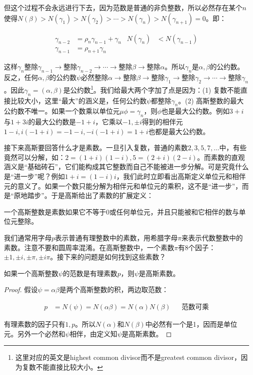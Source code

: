 \documentclass[b5paper]{ctexart}
\begin{document}
但这个过程不会永远进行下去，因为范数是普通的非负整数，所以必然存在某个$n$使得$N(\beta) > N(\gamma_1) > N(\gamma_2) > \dotsb > N(\gamma_n) > N(\gamma_{n+1})= 0$。即：

\begin{align*}
\gamma_{n-2} &= \rho_n \gamma_{n-1} + \gamma_n & N(\gamma_n) &< N(\gamma_{n-1}) \\
\gamma_{n-1} &= \rho_{n+1} \gamma_n
\end{align*}

这样$\gamma_n$整除$\gamma_{n-1} \to$整除$\gamma_{n-2} \to \dotsb \to$整除$\beta \to$整除$\alpha$。所以$\gamma_n$是$\alpha, \beta$的公约数。反之，任何$\alpha, \beta$的公约数$\psi$必然整除$\alpha \to$整除$\beta \to$整除$\gamma_1 \to$整除$\gamma_2 \to \dotsb \to$整除$\gamma_n$。因此$\gamma_n = (\alpha, \beta)$是公约数\footnote{这里对应的英文是highest common divisor而不是greatest common divisor，因为复数不能直接比较大小。}。我们给最大两个字加了点是因为：(1) 复数不能直接比较大小，这里“最大”的涵义是，任何公约数$\psi$都整除$\gamma_n$。(2) 高斯整数的最大公约数不唯一。如果一个数乘以单位元$\mu\phi = \gamma_n$，则$\phi$也是最大公约数。例如$3 + i$与$1 + 3i$的最大公约数是$-1 + i$，它乘以$-1, \pm i$得到的相伴元$1 - i, i(-1 + i) = -1 - i, -i(-1 + i) = 1 + i$也都是最大公约数。

接下来高斯要回答什么才是素数。一旦引入复数，普通的素数$2, 3, 5, 7, \dotsc$中，有些竟然可以分解，如：$2 = (1 + i)(1 - i), 5 = (2 + i)(2 - i)$。而素数的直观涵义是“基础砖石”，它们能构成其它整数而自己不能被进一步分解。可是究竟什么是“进一步”呢？例如$1 + i = (1 - i)i$，我们此时立即看出高斯定义单位元和相伴元的意义了。如果一个数只能分解为相伴元和单位元的乘积，这不是“进一步”，而是“原地踏步”。于是高斯给出了素数的扩展定义：

\begin{definition}
一个高斯整数是素数如果它不等于0或任何单位元，并且只能被和它相伴的数与单位元整除。
\end{definition}

我们通常用字母$p$表示普通有理整数中的素数，用希腊字母$\pi$来表示代数整数中的素数。注意不要和圆周率混淆。在高斯整数中，一个素数$\pi$有8个因子：$\pm 1, \pm i, \pm \pi, \pm i\pi$。接下来的问题是如何找到这些素数？

\begin{proposition}\label{thm:prime-norm}
如果一个高斯整数$\psi$的范数是有理素数$p$，则$\psi$是高斯素数。
\end{proposition}

\begin{proof}
假设$\psi = \alpha\beta$是两个高斯整数的积，两边取范数：

\begin{align*}
p &= N(\psi) = N(\alpha\beta) = N(\alpha)N(\beta)  && \text{范数可乘}
\end{align*}

有理素数的因子只有$1, p$。所以$N(\alpha)$和$N(\beta)$中必然有一个是1，因而是单位元。另外一个必然和$\psi$相伴，由定义知$\psi$是高斯素数。
\end{proof}
\end{document}
